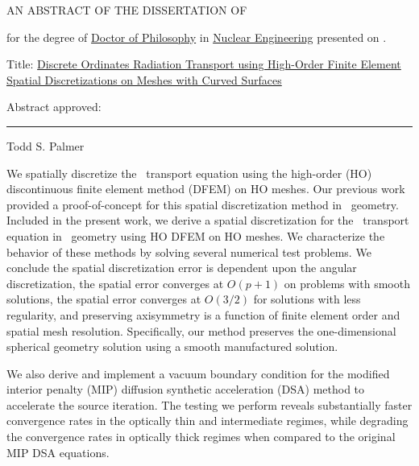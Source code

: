 \documentclass[12pt]{article}
\begin{document}
\begin{singlespace}

\begin{center}
AN ABSTRACT OF THE DISSERTATION OF
\end{center}

\vspace{12pt}

\noindent
\uline{\ThesisAuthor} for the degree of \uline{Doctor of Philosophy} in \uline{Nuclear Engineering} presented on \uline{\DefenseDate}.

\vspace{12pt}

\noindent
Title: \uline{Discrete Ordinates Radiation Transport using High-Order Finite Element Spatial Discretizations on Meshes with Curved Surfaces}

\vspace{12pt}

\noindent
Abstract approved:

\vspace{12pt}

\noindent
\begin{center}
\rule{\textwidth}{0.4pt}

\noindent
Todd S. Palmer
\end{center}

\vspace{12pt}

\end{singlespace}

We spatially discretize the \SN\ transport equation using the high-order (HO) discontinuous finite element method (DFEM) on HO meshes. Our previous work provided a proof-of-concept for this spatial discretization method in \XY\ geometry. Included in the present work, we derive a spatial discretization for the \SN\ transport equation in \RZ\ geometry using HO DFEM on HO meshes. We characterize the behavior of these methods by solving several numerical test problems. We conclude the spatial discretization error is dependent upon the angular discretization, the spatial error converges at $O(p+1)$ on problems with smooth solutions, the spatial error converges at $O(3/2)$ for solutions with less regularity, and preserving axisymmetry is a function of finite element order and spatial mesh resolution. Specifically, our method preserves the one-dimensional spherical geometry solution using a smooth manufactured solution.

We also derive and implement a vacuum boundary condition for the modified interior penalty (MIP) diffusion synthetic acceleration (DSA) method to accelerate the source iteration. The testing we perform reveals substantially faster convergence rates in the optically thin and intermediate regimes, while degrading the convergence rates in optically thick regimes when compared to the original MIP DSA equations.
\end{document}

